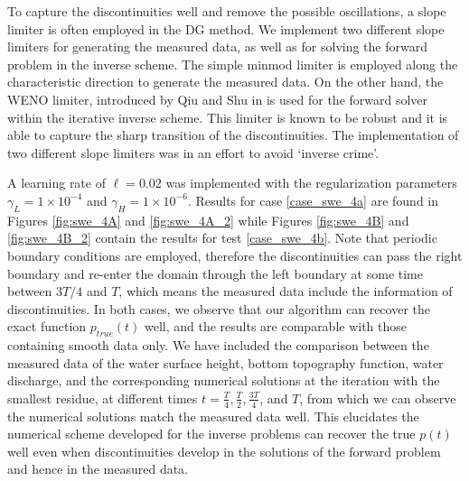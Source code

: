 To capture the discontinuities well and remove the possible oscillations, a slope limiter is often employed in the DG method. We implement two different slope limiters for generating the measured data, as well as for solving the forward problem in the inverse scheme. The simple minmod limiter \cite{Cockburn1989TVBFramework} is employed along the characteristic direction to generate the measured data. On the other hand, the WENO limiter, introduced by Qiu and Shu in \cite{Qiu2005Runge-KuttaLimiters} is used for the forward solver within the iterative inverse scheme. This limiter is known to be robust and it is able to capture the sharp transition of the discontinuities. The implementation of two different slope limiters was in an effort to avoid `inverse crime'.

A learning rate of $\ell=0.02$ was implemented with the regularization parameters $\gamma_L = 1 \times 10^{-4}$ and $\gamma_H = 1 \times 10^{-6}$. Results for case \eqref{case_swe_4a} are found in Figures \ref{fig:swe_4A} and \ref{fig:swe_4A_2} while Figures \ref{fig:swe_4B} and \ref{fig:swe_4B_2} contain the results for test \eqref{case_swe_4b}. Note that periodic boundary conditions are employed, therefore the discontinuities can pass the right boundary and re-enter the domain through the left boundary at some time between $3T/4$ and $T$, which means the measured data include the information of discontinuities. In both cases, we observe that our algorithm can recover the exact function $p_{true}(t)$ well, and the results are comparable with those containing smooth data only. We have included the comparison between the measured data of the water surface height, bottom topography function, water discharge, and the corresponding numerical solutions at the iteration with the smallest residue, at different times $t=\frac{T}{4}, \frac{T}{2}, \frac{3T}{4}$, and $T$, from which we can observe the numerical solutions match the measured data well. This elucidates the numerical scheme developed for the inverse problems can recover the true $p(t)$ well even when discontinuities develop in the solutions of the forward problem and hence in the measured data.    

